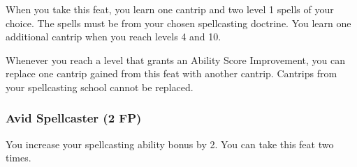     When you take this feat, you learn one cantrip and two level 1 spells of your choice.
    The spells must be from your chosen spellcasting doctrine.
    You learn one additional cantrip when you reach levels 4 and 10.

    Whenever you reach a level that grants an Ability Score Improvement, you can replace one cantrip gained from this feat with another cantrip.
    Cantrips from your spellcasting school cannot be replaced.

\subsubsection{Avid Spellcaster (2 FP)} \label{feat::avidspellcaster}
    You increase your spellcasting ability bonus by 2.
    You can take this feat two times.

\newpage~
\newpage
